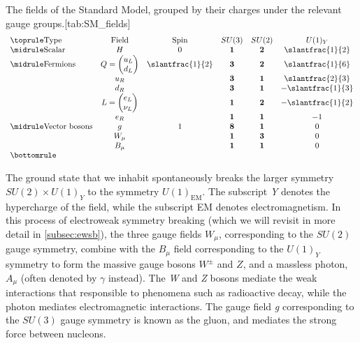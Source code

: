 \begin{table}
  \begin{sidecaption}{The fields of the Standard Model, grouped by their charges under the relevant gauge groups.}[tab:SM_fields]
  \[
  \begin{array}{lccccc}
    \toprule
   \text{Type}                & \text{Field}              & \text{Spin}      & SU(3)      & SU(2)      & U(1)_Y \\\midrule
   \text{Scalar}              & H                         & 0                & \mathbf{1} & \mathbf{2} & \slantfrac{1}{2}\\\midrule
   \text{Fermions}            & Q = \vdoublet{u_L}{d_L}   & \slantfrac{1}{2} & \mathbf{3} & \mathbf{2} & \slantfrac{1}{6}\\
                              & u_R                       &                  & \mathbf{3} & \mathbf{1} & \slantfrac{2}{3}\\
                              & d_R                       &                  & \mathbf{3} & \mathbf{1} & -\slantfrac{1}{3}\\
                              & L = \vdoublet{e_L}{\nu_L} &                  & \mathbf{1} & \mathbf{2} & -\slantfrac{1}{2}\\
                              & e_R                       &                  & \mathbf{1} & \mathbf{1} & -1\\\midrule
    \text{Vector bosons}      & g                         & 1                & \mathbf{8} & \mathbf{1} & 0 \\
                              & W_\mu                     &                  & \mathbf{1} & \mathbf{3} & 0 \\
                              & B_\mu                     &                  & \mathbf{1} & \mathbf{1} & 0\\
    \bottomrule
  \end{array}
\]
\end{sidecaption}
\end{table}

The ground state that we inhabit spontaneously breaks the larger symmetry $SU(2)\times U(1)_Y$ to the symmetry $U(1)_\text{EM}$. The subscript \emph{Y} denotes the hypercharge of the field, while the subscript EM denotes electromagnetism. In this process of electroweak symmetry breaking (which we will revisit in more detail in \autoref{subsec:ewsb}), the three gauge fields $W_\mu$, corresponding to the $SU(2)$ gauge symmetry, combine with the $B_\mu$ field corresponding to the $U(1)_Y$ symmetry to form the massive gauge bosons $W^\pm$ and $Z$, and a massless photon, $A_\mu$ (often denoted by $\gamma$ instead). The \emph{W} and \emph{Z} bosons mediate the weak interactions that responsible to phenomena such as radioactive decay, while the photon mediates electromagnetic interactions. The gauge field \emph{g} corresponding to the $SU(3)$ gauge symmetry is known as the gluon, and mediates the strong force between nucleons. 


